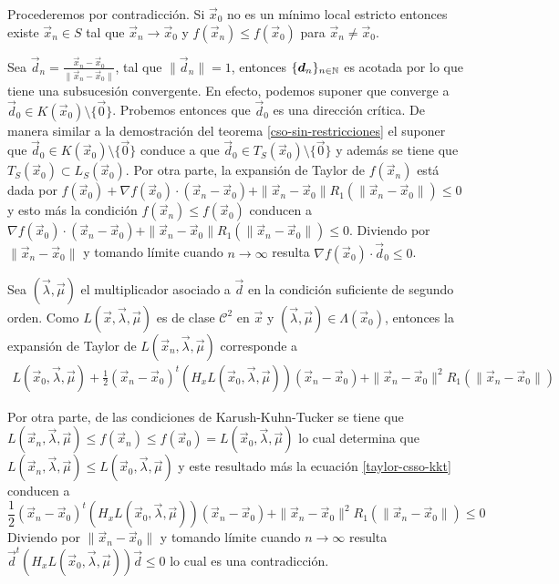 \begin{demostracion}
Procederemos por contradicci\'on. Si $\vec{x}_0$ no es un m\'inimo local estricto entonces existe $\vec{x}_n \in S$ tal que $\vec{x}_n \to \vec{x}_0$ y $f(\vec{x}_n)\leq f(\vec{x}_0)$ para $\vec{x}_n \neq \vec{x}_0$. 

Sea $\vec{d}_n = \frac{\vec{x}_n-\vec{x}_0}{\|\vec{x}_n-\vec{x}_0\|}$, tal que $\|\vec{d}_n\|=1$, entonces $\{\boldsymbol{d}_n\}_{n\in \mathbb{N}}$ es acotada por lo que tiene una subsucesi\'on convergente. En efecto, podemos suponer que converge a $\vec{d}_0 \in K(\vec{x}_0)\setminus \{\vec{0}\}$. Probemos entonces que $\vec{d}_0$ es una direcci\'on cr\'itica. De manera similar a la demostraci\'on del teorema \ref{cso-sin-restricciones} el suponer que $\vec{d}_0 \in K(\vec{x}_0)\setminus \{\vec{0}\}$ conduce a que $\vec{d}_0 \in T_S(\vec{x}_0)\setminus \{\vec{0}\}$ y adem\'as se tiene que $T_S(\vec{x}_0)\subset L_S(\vec{x}_0)$. Por otra parte, la expansi\'on de Taylor de $f(\vec{x}_n)$ est\'a dada por 
$f(\vec{x}_0) + \nabla f(\vec{x}_0)\cdot (\vec{x}_n-\vec{x}_0) + \|\vec{x}_n-\vec{x}_0\| R_1 (\|\vec{x}_n-\vec{x}_0\|)\leq 0$
 y esto m\'as la condici\'on $f(\vec{x}_n) \leq f(\vec{x}_0)$ conducen a $\nabla f(\vec{x}_0)\cdot (\vec{x}_n-\vec{x}_0) + \|\vec{x}_n - \vec{x}_0\| R_1(\|\vec{x}_n - \vec{x}_0\|) \leq 0$. Diviendo por $\|\vec{x}_n - \vec{x}_0\|$ y tomando l\'imite cuando $n\to \infty$ resulta $\nabla f(\vec{x}_0)\cdot \vec{d}_0 \leq 0$.

Sea $(\vec{\lambda},\vec{\mu})$ el multiplicador asociado a $\vec{d}$ en la condici\'on suficiente de segundo orden. Como $L(\vec{x},\vec{\lambda},\vec{\mu})$ es de clase $\mathcal{C}^2$ en $\vec{x}$ y $(\vec{\lambda},\vec{\mu})\in \Lambda(\vec{x}_0)$, entonces la expansi\'on de Taylor de $L(\vec{x}_n,\vec{\lambda},\vec{\mu})$ corresponde a
\begin{gather}\label{taylor-csso-kkt}
L(\vec{x}_0,\vec{\lambda},\vec{\mu}) + \frac{1}{2}(\vec{x}_n-\vec{x}_0)^t (H_x L(\vec{x}_0,\vec{\lambda},\vec{\mu}))(\vec{x}_n-\vec{x}_0)+\|\vec{x}_n-\vec{x}_0\|^2 R_1(\|\vec{x}_n-\vec{x}_0\|) \tag{*}
\end{gather}

Por otra parte, de las condiciones de Karush-Kuhn-Tucker se tiene que $L(\vec{x}_n,\vec{\lambda},\vec{\mu}) \leq f(\vec{x}_n) \leq f(\vec{x}_0) = L(\vec{x}_0,\vec{\lambda},\vec{\mu})$ lo cual determina que $L(\vec{x}_n,\vec{\lambda},\vec{\mu}) \leq L(\vec{x}_0,\vec{\lambda},\vec{\mu})$ y este resultado m\'as la ecuaci\'on \eqref{taylor-csso-kkt} conducen a
$$\frac{1}{2}(\vec{x}_n-\vec{x}_0)^t (H_x L(\vec{x}_0,\vec{\lambda},\vec{\mu}))(\vec{x}_n-\vec{x}_0) + \|\vec{x}_n-\vec{x}_0\|^2 R_1(\|\vec{x}_n-\vec{x}_0\|) \leq 0$$ 
Diviendo por $\|\vec{x}_n - \vec{x}_0\|$ y tomando l\'imite cuando $n\to \infty$ resulta
$\vec{d}^t (H_x L(\vec{x}_0,\vec{\lambda},\vec{\mu}))\vec{d}  \leq 0$ lo cual es una contradicci\'on.
\end{demostracion}

